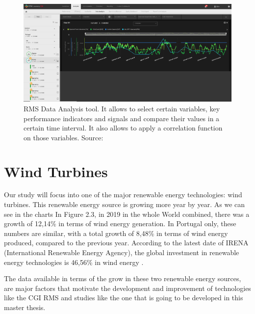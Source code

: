 \begin{figure}[htbp]
	\centering
	\includegraphics[width=\textwidth]{Chapters/Figures/background_fig3.PNG}
	\caption{RMS Data Analysis tool. It allows to select certain variables, key performance indicators and signals and compare their values in a certain time interval. It also allows to apply a correlation function on those variables. Source: \cite{CGIRMS} }
	\label{fig:Figuras_Tree_silhouettes-vectorial}
\end{figure}


\section{Wind Turbines} 
\label{sub:if_you_use_this_template} 

Our study will focus into one of the major renewable energy technologies: wind turbines. This renewable energy source is growing more year by year. As we can see in the charts In Figure 2.3, in 2019 in the whole World combined, there was a growth of 12,14\% in terms of wind energy generation. In Portugal only, these numbers are similar, with a total growth of 8,48\% in terms of wind energy produced, compared to the previous year. According to the latest date of IRENA (International Renewable Energy Agency), the global investment in renewable energy technologies is 46,56\% in wind energy \cite{OLD_33_GENERAL}.

The data available in terms of the grow in these two renewable energy sources, are major factors that motivate the development and improvement of technologies like the CGI RMS and studies like the one that is going to be developed in this master thesis.


